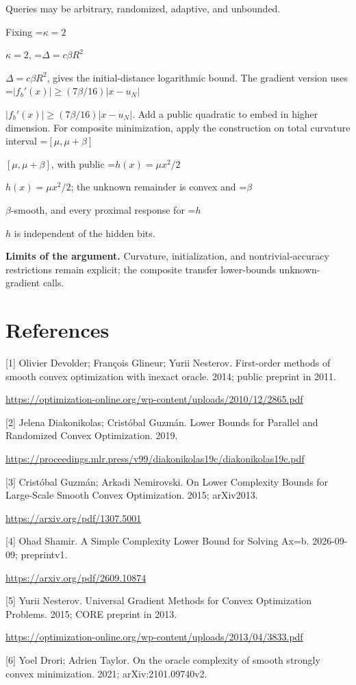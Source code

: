 \documentclass[10pt,a4paper]{article}
\newcommand{\AtlasMath}[1]{\par\begingroup\centering\setbox0=\hbox{$\displaystyle #1$}\ifdim\wd0>1.4\linewidth\typeout{ATLAS WIDE FORMULA: \the\wd0}\fi\ifdim\wd0>\linewidth\resizebox{\linewidth}{!}{\box0}\else\box0\fi\par\endgroup}
\newcommand{\AtlasInlineMath}[1]{\begingroup\setbox0=\hbox{$#1$}\ifdim\wd0>.4\linewidth\endgroup\AtlasMath{#1}\else\endgroup$#1$\fi}
\begin{document}
Queries may be arbitrary, randomized, adaptive, and unbounded.

Fixing \AtlasInlineMath{\kappa=2}, \AtlasInlineMath{\Delta=c\beta R^2}, gives the initial-distance logarithmic bound. The gradient version uses
\AtlasInlineMath{|f_b'(x)|\ge(7\beta/16)|x-u_N|}.
Add a public quadratic to embed in higher dimension. For composite minimization, apply the construction on total curvature interval \AtlasInlineMath{[\mu,\mu+\beta]}, with public \AtlasInlineMath{h(x)=\mu x^2/2}; the unknown remainder is convex and \AtlasInlineMath{\beta}-smooth, and every proximal response for \AtlasInlineMath{h} is independent of the hidden bits.

\textbf{Limits of the argument.} Curvature, initialization, and nontrivial-accuracy restrictions remain explicit; the composite transfer lower-bounds unknown-gradient calls.

\section{References}
[1] Olivier Devolder; François Glineur; Yurii Nesterov. First-order methods of smooth convex optimization with inexact oracle. 2014; public preprint in 2011.

\url{https://optimization-online.org/wp-content/uploads/2010/12/2865.pdf}

[2] Jelena Diakonikolas; Cristóbal Guzmán. Lower Bounds for Parallel and Randomized Convex Optimization. 2019.

\url{https://proceedings.mlr.press/v99/diakonikolas19c/diakonikolas19c.pdf}

[3] Cristóbal Guzmán; Arkadi Nemirovski. On Lower Complexity Bounds for Large-Scale Smooth Convex Optimization. 2015; arXiv2013.

\url{https://arxiv.org/pdf/1307.5001}

[4] Ohad Shamir. A Simple Complexity Lower Bound for Solving Ax=b. 2026-09-09; preprintv1.

\url{https://arxiv.org/pdf/2609.10874}

[5] Yurii Nesterov. Universal Gradient Methods for Convex Optimization Problems. 2015; CORE preprint in 2013.

\url{https://optimization-online.org/wp-content/uploads/2013/04/3833.pdf}

[6] Yoel Drori; Adrien Taylor. On the oracle complexity of smooth strongly convex minimization. 2021; arXiv:2101.09740v2.
\end{document}
